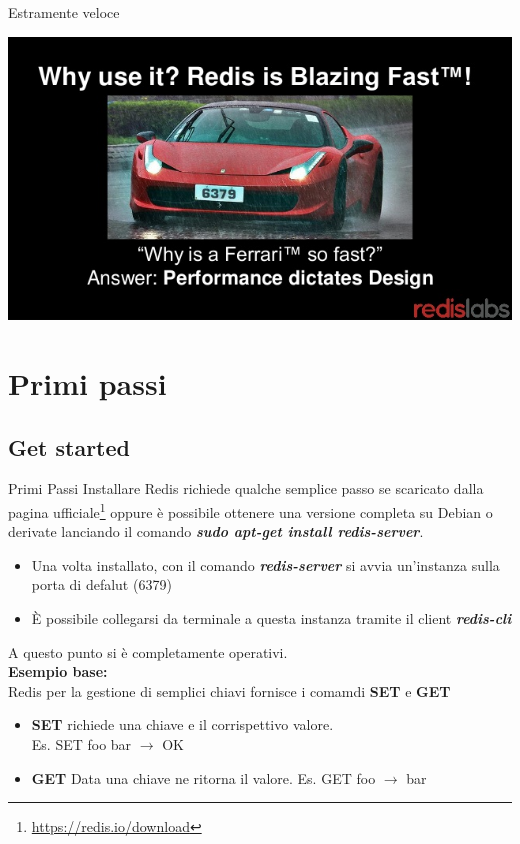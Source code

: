 \documentclass[xcolor=dvipsnames]{beamer}
\begin{document}
      \begin{frame}{Estramente veloce}
        \begin{center}
        \includegraphics[height=6.cm]{res/redisFerrari.jpg}
        \end{center}
      \end{frame}


  \section{Primi passi}
      \begin{frame}
        \begin{block}{\centering \huge \insertsectionhead}
        \end{block}
      \end{frame}
      \subsection{Get started}
        \begin{frame}{Primi Passi}
          Installare Redis richiede qualche semplice passo se scaricato dalla pagina ufficiale\footnote{\url{https://redis.io/download}} oppure è possibile ottenere una versione completa su Debian o derivate lanciando il comando \textbf{\textit{sudo apt-get install redis-server}}.\\

          \begin{itemize}
            \item Una volta installato, con il comando \textbf{\textit{redis-server}} si avvia un'instanza sulla porta di defalut (6379)
            \item È possibile collegarsi da terminale a questa instanza tramite il client \textbf{\textit{redis-cli}}
          \end{itemize}

          A questo punto si è completamente operativi.\\
          \textbf{Esempio base:}\\
          Redis per la gestione di semplici chiavi fornisce i comamdi \textbf{SET} e \textbf{GET}
          \begin{itemize}
            \item \textbf{SET} richiede una chiave e il corrispettivo valore.\\ Es. SET foo bar $\rightarrow$ OK
            \item \textbf{GET} Data una chiave ne ritorna il valore. Es. GET foo $\rightarrow$ bar
          \end{itemize}
        \end{frame}
\end{document}

